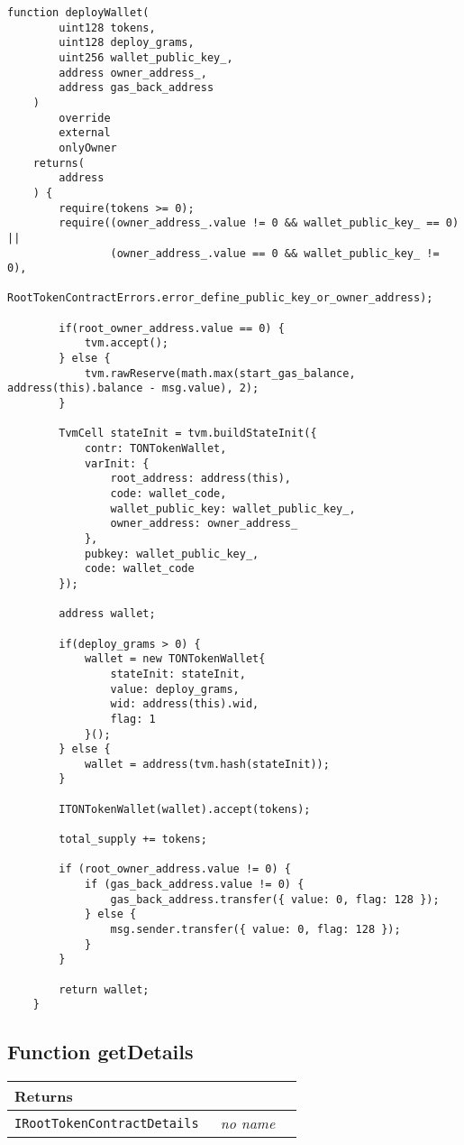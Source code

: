 \begin{lstlisting}[firstnumber=164]
    function deployWallet(
        uint128 tokens,
        uint128 deploy_grams,
        uint256 wallet_public_key_,
        address owner_address_,
        address gas_back_address
    )
        override
        external
        onlyOwner
    returns(
        address
    ) {
        require(tokens >= 0);
        require((owner_address_.value != 0 && wallet_public_key_ == 0) ||
                (owner_address_.value == 0 && wallet_public_key_ != 0),
                RootTokenContractErrors.error_define_public_key_or_owner_address);

        if(root_owner_address.value == 0) {
            tvm.accept();
        } else {
            tvm.rawReserve(math.max(start_gas_balance, address(this).balance - msg.value), 2);
        }

        TvmCell stateInit = tvm.buildStateInit({
            contr: TONTokenWallet,
            varInit: {
                root_address: address(this),
                code: wallet_code,
                wallet_public_key: wallet_public_key_,
                owner_address: owner_address_
            },
            pubkey: wallet_public_key_,
            code: wallet_code
        });

        address wallet;

        if(deploy_grams > 0) {
            wallet = new TONTokenWallet{
                stateInit: stateInit,
                value: deploy_grams,
                wid: address(this).wid,
                flag: 1
            }();
        } else {
            wallet = address(tvm.hash(stateInit));
        }

        ITONTokenWallet(wallet).accept(tokens);

        total_supply += tokens;

        if (root_owner_address.value != 0) {
            if (gas_back_address.value != 0) {
                gas_back_address.transfer({ value: 0, flag: 128 });
            } else {
                msg.sender.transfer({ value: 0, flag: 128 });
            }
        }

        return wallet;
    }
\end{lstlisting}

\subsection{Function getDetails}


\ifsoltables
\noindent\begin{tabular}{|l|l|p{5cm}|}\hline
\multicolumn{3}{|l|}{\bf Returns}\\\hline
\tt IRootTokenContractDetails & {\em no name} &\\\hline
\end{tabular}
\fi

